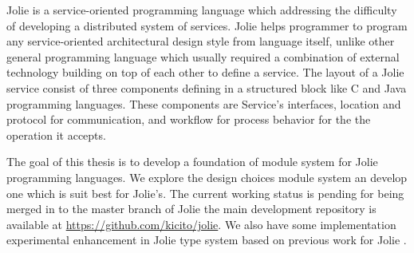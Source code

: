 

Jolie is a service-oriented programming language which addressing the difficulty of developing a distributed system of services. Jolie helps programmer to program any service-oriented architectural design style from language itself, unlike other general programming language which usually required a combination of external technology building on top of each other to define a service. The layout of a Jolie service consist of three components defining in a structured block like C and Java programming languages. These components are Service's interfaces, location and protocol for communication, and workflow for process behavior for the the operation it accepts. 



The goal of this thesis is to develop a foundation of module system for Jolie programming languages. We explore the design choices module system an develop one which is suit best for Jolie's. The current working status is pending for being merged in to the master branch of Jolie the main development repository is available at \url{https://github.com/kicito/jolie}.
We also have some implementation experimental enhancement in Jolie type system based on previous work for Jolie \cite{DBLP:journals/corr/TchitchiginSMEM16}. 

